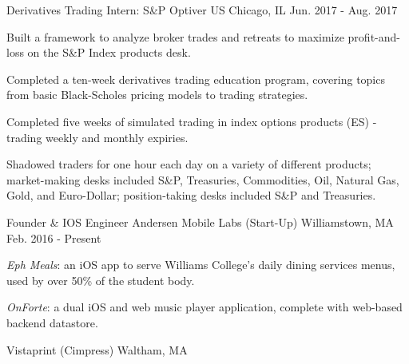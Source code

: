 

\begin{cventries}

  \cventry
    {Derivatives Trading Intern: S\&P} %
    {Optiver US} %
    {Chicago, IL} %
    {Jun. 2017 - Aug. 2017} %
    {
      \begin{cvitems} %
        \item {Built a framework to analyze broker trades and retreats to maximize profit-and-loss on the S\&P Index products desk.}
        \item {Completed a ten-week derivatives trading education program, covering topics from basic Black-Scholes pricing models to trading strategies.}
        \item {Completed five weeks of simulated trading in index options products (ES) - trading weekly and monthly expiries.}
        \item {Shadowed traders for one hour each day on a variety of different products; market-making desks included S\&P, Treasuries, Commodities, Oil, Natural Gas, Gold, and Euro-Dollar; position-taking desks included S\&P and Treasuries.}
      \end{cvitems}
    }

  \cventry
    {Founder \& IOS Engineer} %
    {Andersen Mobile Labs (Start-Up)} %
    {Williamstown, MA} %
    {Feb. 2016 - Present} %
    {
      \begin{cvitems} %
        \item {\textit{Eph Meals}: an iOS app to serve Williams College's daily dining services menus, used by over 50\% of the student body.}
        \item {\textit{OnForte}: a dual iOS and web music player application, complete with web-based backend datastore.}
      \end{cvitems}
    }

\cvexperienceheader
{Vistaprint (Cimpress)} %
{Waltham, MA} %


\end{cventries}
